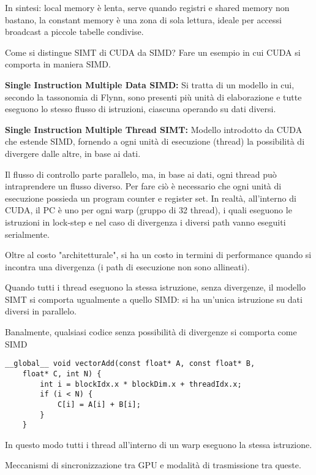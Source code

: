 \documentclass[12pt, answers]{exam}
\begin{document}
\begin{questions}
\begin{solution}
        In sintesi: local memory è lenta, serve quando registri e shared memory non bastano, la constant memory è una zona di sola lettura, ideale per accessi broadcast a piccole tabelle condivise.
    \end{solution}
    
    \question Come si distingue SIMT di CUDA da SIMD? Fare un esempio in cui CUDA si comporta in maniera SIMD.
    
    \begin{solution}
        \textbf{Single Instruction Multiple Data SIMD:} Si tratta di un modello in cui, secondo la tassonomia di Flynn, sono presenti più unità di elaborazione e tutte eseguono lo stesso flusso di istruzioni, ciascuna operando su dati diversi.  
        
        \textbf{Single Instruction Multiple Thread SIMT:} Modello introdotto da CUDA che estende SIMD, fornendo a ogni unità di esecuzione (thread) la possibilità di divergere dalle altre, in base ai dati. 
        
        Il flusso di controllo parte parallelo, ma, in base ai dati, ogni thread può intraprendere un flusso diverso. Per fare ciò è necessario che ogni unità di esecuzione possieda un program counter e register set. In realtà, all'interno di CUDA, il PC è uno per ogni warp (gruppo di 32 thread), i quali eseguono le istruzioni in lock-step e nel caso di divergenza i diversi path vanno eseguiti serialmente.
        
        Oltre al costo "architetturale", si ha un costo in termini di performance quando si incontra una divergenza (i path di esecuzione non sono allineati).
        
        Quando tutti i thread eseguono la stessa istruzione, senza divergenze, il modello SIMT si comporta ugualmente a quello SIMD: si ha un'unica istruzione su dati diversi in parallelo.
        
        Banalmente, qualsiasi codice senza possibilità di divergenze si comporta come SIMD
        \begin{verbatim}
__global__ void vectorAdd(const float* A, const float* B, 
    float* C, int N) {
        int i = blockIdx.x * blockDim.x + threadIdx.x;
        if (i < N) {
            C[i] = A[i] + B[i];
        }
    }
        \end{verbatim}
        In questo modo tutti i thread all'interno di un warp eseguono la stessa istruzione.
    \end{solution}
    
    \question Meccanismi di sincronizzazione tra GPU e modalità di trasmissione tra queste.
    

\end{questions}
\end{document}
